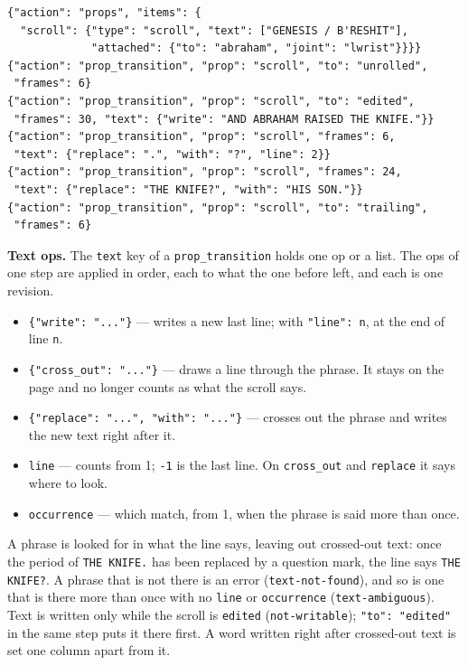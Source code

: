 \documentclass[
  12pt,
  letterpaper,
]{book}
\providecommand{\tightlist}{%
  \setlength{\itemsep}{0pt}\setlength{\parskip}{0pt}}
\begin{document}
\begin{verbatim}
{"action": "props", "items": {
  "scroll": {"type": "scroll", "text": ["GENESIS / B'RESHIT"],
             "attached": {"to": "abraham", "joint": "lwrist"}}}}
{"action": "prop_transition", "prop": "scroll", "to": "unrolled",
 "frames": 6}
{"action": "prop_transition", "prop": "scroll", "to": "edited",
 "frames": 30, "text": {"write": "AND ABRAHAM RAISED THE KNIFE."}}
{"action": "prop_transition", "prop": "scroll", "frames": 6,
 "text": {"replace": ".", "with": "?", "line": 2}}
{"action": "prop_transition", "prop": "scroll", "frames": 24,
 "text": {"replace": "THE KNIFE?", "with": "HIS SON."}}
{"action": "prop_transition", "prop": "scroll", "to": "trailing",
 "frames": 6}
\end{verbatim}

\textbf{Text ops.} The \texttt{text} key of a
\texttt{prop\_transition} holds one op or a list. The ops of one step
are applied in order, each to what the one before left, and each is
one revision.

\begin{itemize}
\tightlist
\item
  \texttt{\{"write": "..."\}} --- writes a new last line; with
  \texttt{"line": n}, at the end of line \texttt{n}.
\item
  \texttt{\{"cross\_out": "..."\}} --- draws a line through the
  phrase. It stays on the page and no longer counts as what the scroll
  says.
\item
  \texttt{\{"replace": "...", "with": "..."\}} --- crosses out the
  phrase and writes the new text right after it.
\item
  \texttt{line} --- counts from 1; \texttt{-1} is the last line. On
  \texttt{cross\_out} and \texttt{replace} it says where to look.
\item
  \texttt{occurrence} --- which match, from 1, when the phrase is said
  more than once.
\end{itemize}

A phrase is looked for in what the line says, leaving out crossed-out
text: once the period of \texttt{THE KNIFE.} has been replaced by a
question mark, the line says \texttt{THE KNIFE?}. A phrase that is not
there is an error (\texttt{text-not-found}), and so is one that is
there more than once with no \texttt{line} or \texttt{occurrence}
(\texttt{text-ambiguous}). Text is written only while the scroll is
\texttt{edited} (\texttt{not-writable}); \texttt{"to": "edited"} in
the same step puts it there first. A word written right after
crossed-out text is set one column apart from it.
\end{document}
